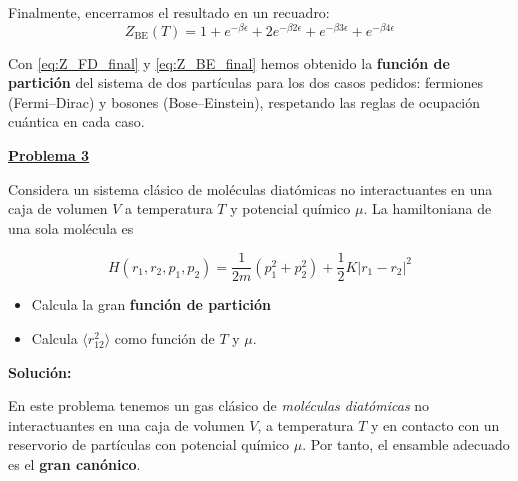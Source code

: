 \documentclass{article}
\newenvironment{AGbox}[1][7]%
{%
  \begin{tcolorbox}[
    enhanced, breakable,
    colframe=AppleGreen,
    colback=AppleGreen!#1,
    boxrule=1pt,
    borderline west={2mm}{-10mm}{AppleGreen},
    sharp corners=southwest,
    left=14pt,right=14pt,top=10pt,bottom=10pt,
     boxsep=6pt,
  ]%
}{%
  \end{tcolorbox}%
}
\begin{document}
Finalmente, encerramos el resultado en un recuadro:
\begin{equation}
\boxed{
Z_{\text{BE}}(T)
= 1
 + e^{-\beta\epsilon}
 + 2e^{-\beta 2\epsilon}
 + e^{-\beta 3\epsilon}
 + e^{-\beta 4\epsilon}
}
\label{eq:Z_BE_final}
\end{equation}

Con \eqref{eq:Z_FD_final} y \eqref{eq:Z_BE_final} hemos obtenido la
\textcolor{Cinnabar}{\textbf{función de partición}} del sistema de dos partículas para los dos casos
pedidos: fermiones (Fermi–Dirac) y bosones (Bose–Einstein), respetando las reglas
de ocupación cuántica en cada caso.


\vspace{0.6cm}


\begin{AGbox}[8]
\textcolor{Apple Green}{\textbf{\underline{Problema 3}}} \vspace{2mm}

Considera un sistema clásico de moléculas diatómicas no interactuantes en una
caja de volumen $V$ a temperatura $T$ y potencial químico $\mu$. La hamiltoniana
de una sola molécula es

\[
H(r_{1}, r_{2}, p_{1}, p_{2}) = \frac{1}{2m}(p_{1}^{2} + p_{2}^{2}) + \frac{1}{2} K |r_{1} - r_{2}|^{2}
\]

\begin{itemize}
    \item[$\bullet$] Calcula la gran  \textcolor{Cinnabar}{\textbf{función de partición}}

    \item[$\bullet$] Calcula $\langle r_{12}^{2} \rangle$ como función de $T$ y $\mu$.
\end{itemize}
\end{AGbox} \vspace{0.5cm}

\textcolor{Tuscany}{\textbf{Solución:}}

En este problema tenemos un gas clásico de \emph{moléculas diatómicas} no
interactuantes en una caja de volumen \(V\), a temperatura \(T\) y en contacto con
un reservorio de partículas con potencial químico \(\mu\).  
Por tanto, el ensamble adecuado es el \textcolor{Tarawera}{\textbf{gran canónico}}.
\end{document}
